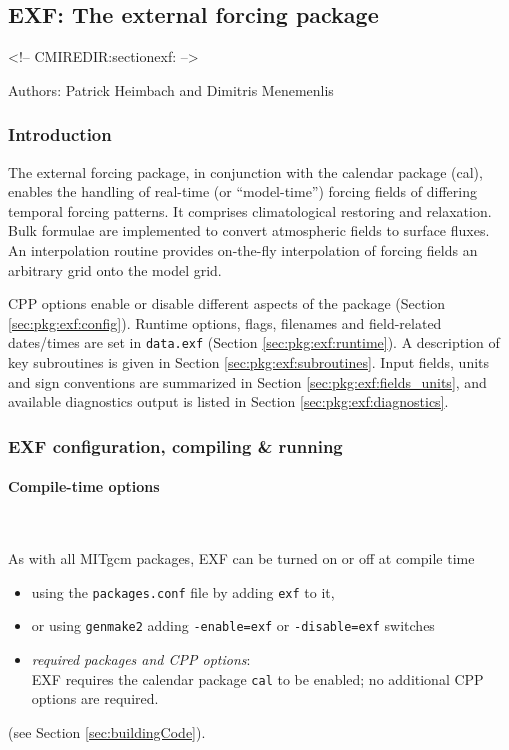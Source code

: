 \subsection{EXF: The external forcing package
\label{sec:pkg:exf}}
\begin{rawhtml}
<!-- CMIREDIR:sectionexf: -->
\end{rawhtml}

Authors: Patrick Heimbach and Dimitris Menemenlis

\subsubsection{Introduction
\label{sec:pkg:exf:intro}}

The external forcing package, in conjunction with the
calendar package (cal), enables the handling of real-time
(or ``model-time'') forcing
fields of differing temporal forcing patterns.
It comprises climatological restoring and relaxation.
Bulk formulae are implemented to convert atmospheric fields
to surface fluxes.
An interpolation routine provides on-the-fly interpolation of
forcing fields an arbitrary grid onto the model grid.

CPP options enable or disable different aspects of the package
(Section \ref{sec:pkg:exf:config}).
Runtime options, flags, filenames and field-related dates/times are
set in \texttt{data.exf}
(Section \ref{sec:pkg:exf:runtime}).
A description of key subroutines is given in Section
\ref{sec:pkg:exf:subroutines}.
Input fields, units and sign conventions are summarized in
Section \ref{sec:pkg:exf:fields_units}, and available diagnostics
output is listed in Section \ref{sec:pkg:exf:diagnostics}.


\subsubsection{EXF configuration, compiling \& running}

\paragraph{Compile-time options
\label{sec:pkg:exf:config}}
~

As with all MITgcm packages, EXF can be turned on or off at compile time
%
\begin{itemize}
%
\item
using the \texttt{packages.conf} file by adding \texttt{exf} to it,
%
\item
or using \texttt{genmake2} adding
\texttt{-enable=exf} or \texttt{-disable=exf} switches
%
\item
\textit{required packages and CPP options}: \\
EXF requires the calendar package \texttt{cal} to be enabled;
no additional CPP options are required.
%
\end{itemize}
(see Section \ref{sec:buildingCode}).

